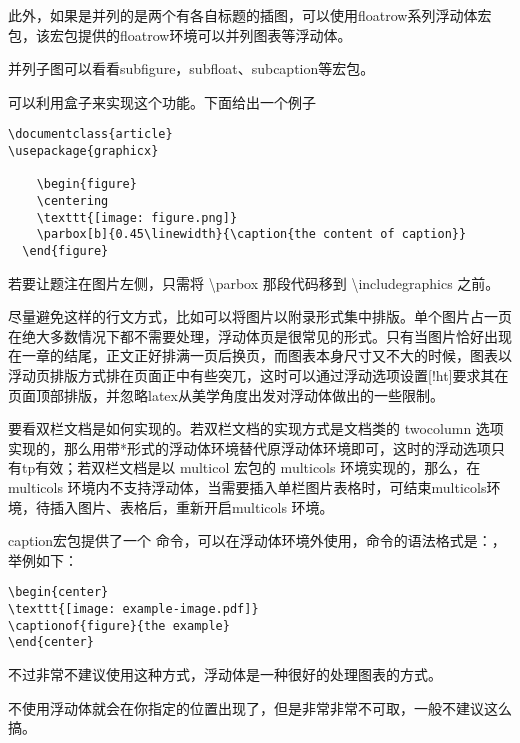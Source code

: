 此外，如果是并列的是两个有各自标题的插图，可以使用floatrow系列浮动体宏包，该宏包提供的floatrow环境可以并列图表等浮动体。



并列子图可以看看subfigure，subfloat、subcaption等宏包。



可以利用盒子来实现这个功能。下面给出一个例子

\begin{verbatim}
\documentclass{article}
\usepackage{graphicx}

    \begin{figure}
    \centering
    \texttt{[image: figure.png]}
    \parbox[b]{0.45\linewidth}{\caption{the content of caption}}
  \end{figure}

\end{verbatim}

若要让题注在图片左侧，只需将 \textbackslash{}parbox 那段代码移到
\textbackslash{}includegraphics 之前。



尽量避免这样的行文方式，比如可以将图片以附录形式集中排版。单个图片占一页在绝大多数情况下都不需要处理，浮动体页是很常见的形式。只有当图片恰好出现在一章的结尾，正文正好排满一页后换页，而图表本身尺寸又不大的时候，图表以浮动页排版方式排在页面正中有些突兀，这时可以通过浮动选项设置{[}!ht{]}要求其在页面顶部排版，并忽略latex从美学角度出发对浮动体做出的一些限制。



要看双栏文档是如何实现的。若双栏文档的实现方式是文档类的 twocolumn
选项实现的，那么用带*形式的浮动体环境替代原浮动体环境即可，这时的浮动选项只有tp有效；若双栏文档是以
multicol 宏包的 multicols 环境实现的，那么，在 multicols
环境内不支持浮动体，当需要插入单栏图片表格时，可结束multicols环境，待插入图片、表格后，重新开启multicols
环境。



caption宏包提供了一个
命令，可以在浮动体环境外使用，命令的语法格式是：，举例如下：

\begin{verbatim}
\begin{center}
\texttt{[image: example-image.pdf]}
\captionof{figure}{the example}
\end{center}
\end{verbatim}

不过非常不建议使用这种方式，浮动体是一种很好的处理图表的方式。



不使用浮动体就会在你指定的位置出现了，但是非常非常不可取，一般不建议这么搞。





